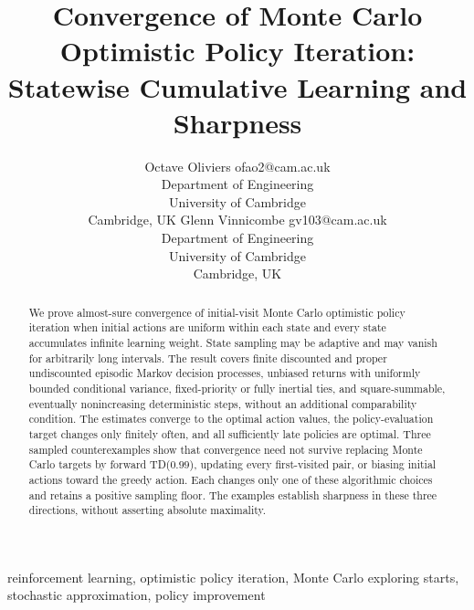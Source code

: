 \documentclass[twoside,11pt]{article}
\begin{document}
\raggedbottom
\title{Convergence of Monte Carlo Optimistic Policy Iteration:\\
Statewise Cumulative Learning and Sharpness}
\author{\name Octave Oliviers \email ofao2@cam.ac.uk \\
\addr Department of Engineering\\
University of Cambridge\\
Cambridge, UK
\AND
\name Glenn Vinnicombe \email gv103@cam.ac.uk \\
\addr Department of Engineering\\
University of Cambridge\\
Cambridge, UK}
\maketitle
\begin{abstract}
We prove almost-sure convergence of initial-visit Monte Carlo optimistic policy iteration
when initial actions are uniform within each state and every state accumulates infinite
learning weight. State sampling may be adaptive and may vanish for arbitrarily long
intervals. The result covers finite discounted and proper undiscounted episodic Markov
decision processes, unbiased returns with uniformly bounded conditional variance, fixed-priority or fully inertial ties, and square-summable, eventually nonincreasing deterministic
steps, without an additional comparability condition. The estimates converge to the optimal
action values, the policy-evaluation target changes only finitely often, and all sufficiently
late policies are optimal. Three sampled counterexamples show that convergence need not
survive replacing Monte Carlo targets by forward TD($0.99$), updating every first-visited
pair, or biasing initial actions toward the greedy action. Each changes only one of these
algorithmic choices and retains a positive sampling floor. The examples establish sharpness
in these three directions, without asserting absolute maximality.
\end{abstract}
\begin{keywords}
reinforcement learning, optimistic policy iteration, Monte Carlo exploring
starts, stochastic approximation, policy improvement
\end{keywords}



\end{document}
